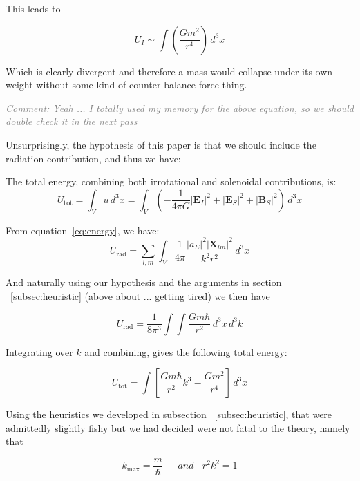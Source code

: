 \documentclass {article}
\renewcommand\vec{\mathbf}
\newcommand{\comment}[1]{\textcolor{gray}{\small\textit{Comment: #1}}}
\begin{document}
This leads to 

\begin{equation}
U_I\sim \int \left(\frac { Gm^2} {r^4} \right) \, d^3x
\end{equation}

Which is clearly divergent and therefore a mass would collapse under its own weight without some kind of counter balance force thing.

\comment{Yeah ... I totally used my memory for the above equation, so we should double check it in the next pass}

Unsurprisingly, the hypothesis of this paper is that we should include the radiation contribution, and thus we have:

The total energy, combining both irrotational and solenoidal contributions, is:
\begin{equation}
U_{\text{tot}} = \int_V u \, d^3x = \int_V \left( -\frac{1}{4\pi G} |\vec{E}_I|^2 + |\vec{E}_S|^2 + |\vec{B}_S|^2 \right) \, d^3x
\end{equation}



From equation~\eqref{eq:energy}, we have:
\begin{equation}
U_{\text{rad}} = \sum_{l, m} \int_V \frac{1}{4\pi} \frac{|a_E|^2 |\vec{X}_{lm}|^2}{k^2 r^2} \, d^3x
\end{equation}

And naturally using our hypothesis and the arguments in section  ~\ref{subsec:heuristic} (above about ... getting tired) we then have

\begin{equation}
U_{\text{rad}} =  \frac{1}{8\pi^3} \int \int \frac{Gm \hbar}{r^2} \, d^3x \, d^3k
\end{equation}

Integrating over \(k\) and combining, gives the following total energy:

\begin{equation}
U_{\text{tot}} = \int \left[ \frac{Gm \hbar}{r^2}k^3  - \frac {Gm^2} {r^4}\right] \, d^3x 
\end{equation}


Using the heuristics we developed in subsection ~\ref{subsec:heuristic}, that were admittedly slightly fishy but we had decided were not fatal to the theory, namely that

\begin{equation}
k_{\text{max} }= \frac m {\hbar} ~~~~~~~ and ~~~~ r^2k^2 = 1 
\end{equation}
\end{document}
